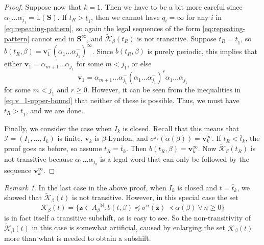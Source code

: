\documentclass[11pt]{amsart}
\theoremstyle{definition}
\theoremstyle{remark}
\newtheorem{remark}[theorem]{Remark}
\numberwithin{equation}{section}
\newcommand{\N}{\ensuremath{\mathbb{N}}}
\renewcommand{\L}{\ensuremath{\mathbb{L}}}
\newcommand{\II}{\mathcal{I}}
\newcommand{\Kt}{\widetilde{\mathcal{K}}}
\newcommand{\cs}{ {\mathbf{S}}}
\renewcommand{\v}{\mathbf{v}}
\newcommand{\z}{\mathbf{z}}
\newcommand{\f}{\infty}
\newcommand{\al}{\alpha}
\newcommand{\lle}{\preccurlyeq}
\newcommand{\si}{\sigma}
\begin{document}
\begin{proof}
Suppose now that $k=1$. Then we have to be a bit more careful since $\al_1\dots\al_{j_1}^-=\L(\cs)$. If $t_R>\underline{t}_1$, then we cannot have $q_i=\infty$ for any $i$ in \eqref{eq:repeating-pattern}, so again the legal sequences of the form \eqref{eq:repeating-pattern} cannot end in $\cs^\f$, and $\Kt_\beta(t_R)$ is not transitive. Suppose $t_R=\underline{t}_1$, so $b(t_R,\beta)=\v_1^-(\al_1\dots\al_{j_1}^-)^\f$. Since $b(t_R,\beta)$ is purely periodic, this implies that either $\v_1=\al_{m+1}\dots\al_{j_1}$ for some $m<j_1$, or else
\[
\v_1=\al_{m+1}\dots\al_{j_1}^-(\al_1\dots\al_{j_1}^-)^r\al_1\dots \al_{j_1}
\]
for some $m<j_1$ and $r\geq 0$. However, it can be seen from the inequalities in \eqref{eq:v_1-upper-bound} that neither of these is possible. Thus, we must have $t_R>\underline{t}_1$, and we are done.

Finally, we consider the case when $I_k$ is closed. Recall that this means that $\II=(I_1,\dots,I_k)$ is finite, $\v_k$ is $\beta$-Lyndon, and $\si^{j_k}(\al(\beta))=\v_k^\f$. If $t_R<\overline{t}_k$, the proof goes as before, so assume $t_R=\overline{t}_k$. Then $b(t_R,\beta)=\v_k^\f$. Now $\Kt_\beta(t_R)$ is not transitive because $\al_1\dots\al_{j_k}$ is a legal word that can only be followed by the sequence $\v_k^\f$.
\end{proof}

\begin{remark}
In the last case in the above proof, when $I_k$ is closed and $t=\overline{t}_k$, we showed that $\Kt_\beta(t)$ is not transitive. However, in this special case the set
\[
\mathcal{K}_\beta(t)=\{\z\in{A_\beta}^\N: b(t,\beta)\lle \si^n(\z)\prec\al(\beta)\ \forall\,n\geq 0\}
\]
is in fact itself a transitive subshift, as is easy to see. So the non-transitivity of $\Kt_\beta(t)$ in this case is somewhat artificial, caused by enlarging the set $\mathcal{K}_\beta(t)$ more than what is needed to obtain a subshift.
\end{remark}
\end{document}
